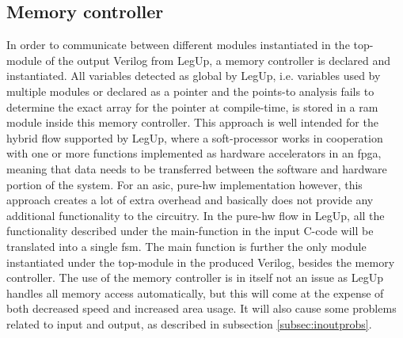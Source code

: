 \subsection{\label{subsec:memctrl}Memory controller}
In order to communicate between different modules instantiated in the top-module of the output Verilog from LegUp, a memory controller is declared and instantiated. All variables detected as global by LegUp, i.e. variables used by multiple modules or declared as a pointer and the points-to analysis fails to determine the exact array for the pointer at compile-time, is stored in a ram module inside this memory controller. This approach is well intended for the hybrid flow supported by LegUp, where a soft-processor works in cooperation with one or more functions implemented as hardware accelerators in an \gls{fpga}, meaning that data needs to be transferred between the software and hardware portion of the system. For an \gls{asic}, pure-\gls{hw} implementation however, this approach creates a lot of extra overhead and basically does not provide any additional functionality to the circuitry. In the pure-\gls{hw} flow in LegUp, all the functionality described under the main-function in the input C-code will be translated into a single \gls{fsm}. The main function is further the only module instantiated under the top-module in the produced Verilog, besides the memory controller. The use of the memory controller is in itself not an issue as LegUp handles all memory access automatically, but this will come at the expense of both decreased speed and increased area usage. It will also cause some problems related to input and output, as described in subsection \ref{subsec:inoutprobs}.
